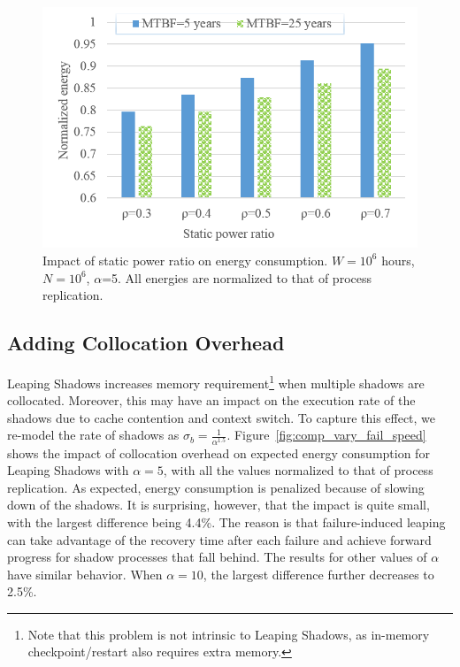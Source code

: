 \begin{figure}[!h]
	\begin{center}
		\includegraphics[width=0.6\columnwidth]{Figures/ts_power_5}
	\end{center}
	\caption{Impact of static power ratio on energy consumption. $W=10^6$ hours, $N=10^6$, $\alpha$=5. All energies are normalized to that of process replication.}
	\label{fig:power_ratio}
\end{figure}


\subsection{Adding Collocation Overhead}
\label{eval_collocation}

Leaping Shadows increases memory requirement\footnote{Note that this problem is not intrinsic to Leaping Shadows, as in-memory checkpoint/restart also requires extra memory.} when multiple shadows are collocated. Moreover, this may have an impact on the execution rate of the shadows due to cache contention and context switch. 
To capture this effect,  
we re-model the rate of shadows as $\sigma_b=\frac{1}{\alpha^{1.5}}$.
Figure~\ref{fig:comp_vary_fail_speed} shows the impact of collocation overhead on expected energy consumption for Leaping Shadows with $\alpha=5$, with all the values normalized to that of process replication. %
As expected, energy consumption is penalized because
of slowing down of the shadows. It is surprising, however, that the impact is quite small, with the largest difference being 4.4\%. The reason is that failure-induced leaping can take advantage of the recovery time after each failure and achieve forward progress for shadow processes that fall behind. 
The results for other values of $\alpha$ have similar behavior. 
When $\alpha=10$, the largest difference further decreases to 2.5\%. 

